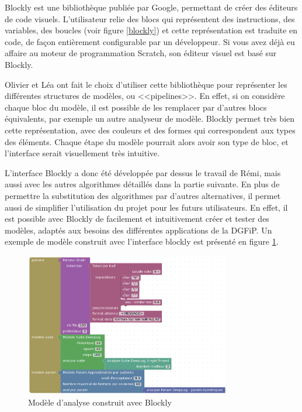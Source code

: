 \documentclass[openany, 11pt]{memoir}
\begin{document}
Blockly est une bibliothèque publiée par Google, permettant de créer des éditeurs de code visuels. L'utilisateur relie des blocs qui représentent des instructions, des variables, des boucles (voir figure \ref{blockly}) et cette représentation est traduite en code, de façon entièrement configurable par un développeur. Si vous avez déjà eu affaire au moteur de programmation Scratch, son éditeur visuel est basé sur Blockly.

\bigskip
Olivier et Léa ont fait le choix d'utiliser cette bibliothèque pour représenter les différentes structures de modèles, ou <<pipelines>>. En effet, si on considère chaque bloc du modèle, il est possible de les remplacer par d'autres blocs équivalents, par exemple un autre analyseur de modèle. Blockly permet très bien cette représentation, avec des couleurs et des formes qui correspondent aux types des éléments. Chaque étape du modèle pourrait alors avoir son type de bloc, et l'interface serait visuellement très intuitive.

L'interface Blockly a donc été développée par dessus le travail de Rémi, mais aussi avec les autres algorithmes détaillés dans la partie suivante. En plus de permettre la substitution des algorithmes par d'autres alternatives, il permet aussi de simplifier l'utilisation du projet pour les futurs utilisateurs. En effet, il est possible avec Blockly de facilement et intuitivement créer et tester des modèles, adaptés aux besoins des différentes applications de la \gls{DGFiP}. Un exemple de modèle construit avec l'interface blockly est présenté en figure \ref{blocklydeeplog}.

\begin{figure}[ht]
	\centering
	\includegraphics[width=0.8\textwidth]{images/blockly_deeplog.png}
	\caption{Modèle d'analyse construit avec Blockly}
	\label{blocklydeeplog}
\end{figure}
\end{document}
